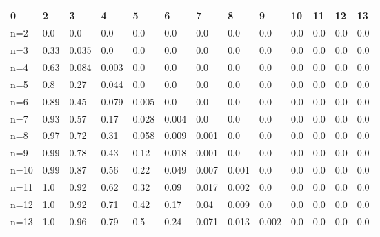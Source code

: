 \begin{tabular}{l|llllllllllll}
\toprule 
0 & 2 & 3 & 4 & 5 & 6 & 7 & 8 & 9 & 10 & 11 & 12 & 13 \\
\hline 
n=2 & 0.0 & 0.0 & 0.0 & 0.0 & 0.0 & 0.0 & 0.0 & 0.0 & 0.0 & 0.0 & 0.0 & 0.0 \\
n=3 & 0.33 & 0.035 & 0.0 & 0.0 & 0.0 & 0.0 & 0.0 & 0.0 & 0.0 & 0.0 & 0.0 & 0.0 \\
n=4 & 0.63 & 0.084 & 0.003 & 0.0 & 0.0 & 0.0 & 0.0 & 0.0 & 0.0 & 0.0 & 0.0 & 0.0 \\
n=5 & 0.8 & 0.27 & 0.044 & 0.0 & 0.0 & 0.0 & 0.0 & 0.0 & 0.0 & 0.0 & 0.0 & 0.0 \\
n=6 & 0.89 & 0.45 & 0.079 & 0.005 & 0.0 & 0.0 & 0.0 & 0.0 & 0.0 & 0.0 & 0.0 & 0.0 \\
n=7 & 0.93 & 0.57 & 0.17 & 0.028 & 0.004 & 0.0 & 0.0 & 0.0 & 0.0 & 0.0 & 0.0 & 0.0 \\
n=8 & 0.97 & 0.72 & 0.31 & 0.058 & 0.009 & 0.001 & 0.0 & 0.0 & 0.0 & 0.0 & 0.0 & 0.0 \\
n=9 & 0.99 & 0.78 & 0.43 & 0.12 & 0.018 & 0.001 & 0.0 & 0.0 & 0.0 & 0.0 & 0.0 & 0.0 \\
n=10 & 0.99 & 0.87 & 0.56 & 0.22 & 0.049 & 0.007 & 0.001 & 0.0 & 0.0 & 0.0 & 0.0 & 0.0 \\
n=11 & 1.0 & 0.92 & 0.62 & 0.32 & 0.09 & 0.017 & 0.002 & 0.0 & 0.0 & 0.0 & 0.0 & 0.0 \\
n=12 & 1.0 & 0.92 & 0.71 & 0.42 & 0.17 & 0.04 & 0.009 & 0.0 & 0.0 & 0.0 & 0.0 & 0.0 \\
n=13 & 1.0 & 0.96 & 0.79 & 0.5 & 0.24 & 0.071 & 0.013 & 0.002 & 0.0 & 0.0 & 0.0 & 0.0 \\
\bottomrule 
\end{tabular}
